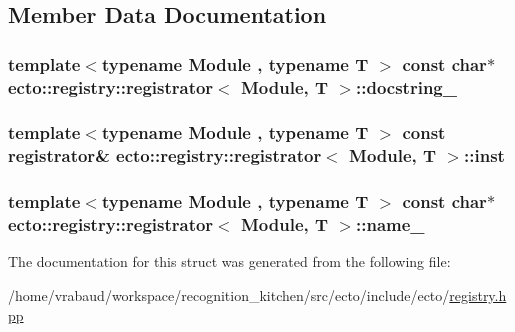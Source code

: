 \subsection{Member Data Documentation}
\hypertarget{structecto_1_1registry_1_1registrator_a6eb361c892595a3d71ab627829c07bdb}{
\subsubsection[{docstring\-\_\-}]{\setlength{\rightskip}{0pt plus 5cm}template$<$typename Module , typename T $>$ const char$\ast$ {\bf ecto\-::registry\-::registrator}$<$ Module, T $>$\-::docstring\-\_\-}}\label{structecto_1_1registry_1_1registrator_a6eb361c892595a3d71ab627829c07bdb}
\hypertarget{structecto_1_1registry_1_1registrator_a0b0f6e3aa1718476b962a007786e7496}{
\subsubsection[{inst}]{\setlength{\rightskip}{0pt plus 5cm}template$<$typename Module , typename T $>$ const {\bf registrator}\& {\bf ecto\-::registry\-::registrator}$<$ Module, T $>$\-::inst\hspace{0.3cm}{\ttfamily [static]}}}\label{structecto_1_1registry_1_1registrator_a0b0f6e3aa1718476b962a007786e7496}
\hypertarget{structecto_1_1registry_1_1registrator_a794acc964cefc0a374129823b4ee5246}{
\subsubsection[{name\-\_\-}]{\setlength{\rightskip}{0pt plus 5cm}template$<$typename Module , typename T $>$ const char$\ast$ {\bf ecto\-::registry\-::registrator}$<$ Module, T $>$\-::name\-\_\-}}\label{structecto_1_1registry_1_1registrator_a794acc964cefc0a374129823b4ee5246}


The documentation for this struct was generated from the following file\-:\begin{DoxyCompactItemize}
\item 
/home/vrabaud/workspace/recognition\-\_\-kitchen/src/ecto/include/ecto/\hyperlink{registry_8hpp}{registry.\-hpp}\end{DoxyCompactItemize}
